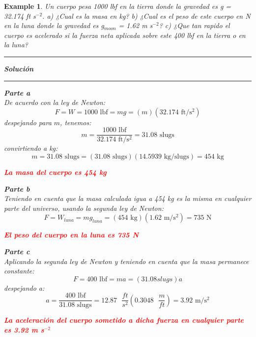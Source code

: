 \documentclass[10pt, oneside]{article}
\newtheorem{exa}{Example}
\begin{document}
\begin{shaded}
\begin{exa}
Un cuerpo pesa 1000 lbf en la tierra donde la gravedad es g = 32.174 ft s$^{-2}$. a) ¿Cual es la masa en kg? b) ¿Cual es el peso de este cuerpo en N en la luna donde la gravedad es g$_{moon}$ = 1.62 m s$^{-2}$? c) ¿Que tan rapido el cuerpo es acelerado si la fuerza neta aplicada sobre este 400 lbf en la tierra o en la luna?
\vspace{0.2cm}
\hrule
\vspace{0.2cm}
\noindent \textbf{Soluci\'on}
\vspace{0.2cm}
\hrule
\vspace{0.2cm}
\noindent \textbf{Parte a}\\ 
De acuerdo con la ley de Newton:
$$
F=W=1000 \text{ lbf} = mg=(m)(32.174 \text{ ft/s$^2$})
$$
despejando para $m$, tenemos:
$$
m = \frac{1000 \text{ lbf}}{32.174 \text{ ft/s$^2$}} = 31.08 \text{ slugs}
$$
convirtiendo a kg:
$$
m = 31.08 \text{ slugs} = (31.08 \text{ slugs})(14.5939 \text{ kg/slugs}) = 454 \text{ kg}
$$
\begin{center}
\textcolor{red}{\textbf{La masa del cuerpo es 454 kg}}
\end{center}

\noindent \textbf{Parte b}\\
Teniendo en cuenta que la masa calculada igua a 454 kg es la misma en cualquier parte del universo, usando la segunda ley de Newton:
$$
F = W_{luna} = mg_{luna} = (454\text{ kg})(1.62 \text{ m/s$^2$})=735 \text{ N}
$$
\begin{center}
\textcolor{red}{\textbf{El peso del cuerpo en la luna es 735 N}}
\end{center}

\noindent \textbf{Parte c}\\
Aplicando la segunda ley de Newton y teniendo en cuenta que la masa permanece constante:
$$
F = 400 \text{ lbf} = ma = (31.08 slugs)a
$$
despejando a:
$$
a = \frac{400 \text{ lbf}}{31.08 \text{ slugs}} = 12.87 \text{ $\frac{ft}{s^2}$} \left( 0.3048\text{ $\frac{m}{ft}$} \right) = 3.92 \text{ m/s$^2$}
$$

\begin{center}
\textcolor{red}{\textbf{La aceleraci\'on del cuerpo sometido a dicha fuerza en cualquier parte es 3.92 m s$^{-2}$}}
\end{center}

\end{exa}
\end{shaded}
\end{document}
